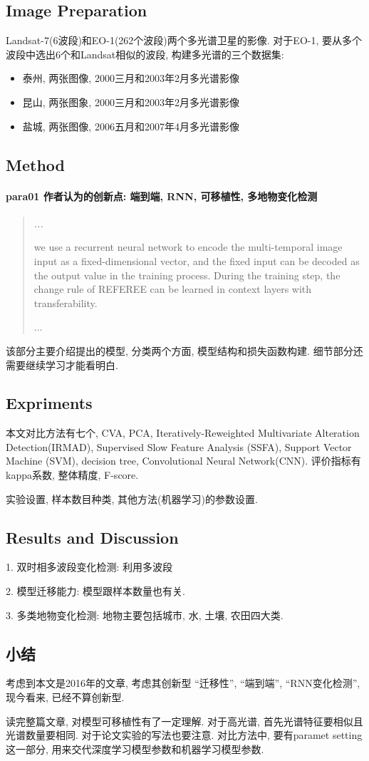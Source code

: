\subsection{Image Preparation}
Landsat-7(6波段)和EO-1(262个波段)两个多光谱卫星的影像. 对于EO-1, 要从多个波段中选出6个和Landsat相似的波段, 构建多光谱的三个数据集:
\begin{itemize}
    \item 泰州, 两张图像, 2000三月和2003年2月多光谱影像
    \item 昆山, 两张图象, 2000三月和2003年2月多光谱影像
    \item 盐城, 两张图像, 2006五月和2007年4月多光谱影像
\end{itemize}
    
\subsection{Method}
\paragraph*{para01
    \textcolor[RGB]{17, 205, 29}{作者认为的创新点: 端到端, RNN, 可移植性, 多地物变化检测}}
\begin{quotation}
    \itshape
    ...

    we use a recurrent neural network to encode the multi-temporal image input as a fixed-dimensional vector, and the fixed input can be decoded as the output value in the training process. During the training step, the change rule of REFEREE can be learned in context layers with transferability.

    ...
\end{quotation}

该部分主要介绍提出的模型, 分类两个方面, 模型结构和损失函数构建. 细节部分还需要继续学习才能看明白.

\subsection{Expriments}
本文对比方法有七个, CVA, PCA, Iteratively-Reweighted Multivariate Alteration Detection(IRMAD), Supervised Slow Feature Analysis (SSFA), Support Vector Machine (SVM), decision tree,  Convolutional Neural Network(CNN). 评价指标有kappa系数, 整体精度, F-score.

实验设置, 样本数目种类, 其他方法(机器学习)的参数设置.

\subsection{Results and Discussion}
1. 双时相多波段变化检测: 利用多波段

2. 模型迁移能力: 模型跟样本数量也有关.

3. 多类地物变化检测: 地物主要包括城市, 水, 土壤, 农田四大类.

\subsection{小结}
考虑到本文是2016年的文章, 考虑其创新型 ``迁移性'', ``端到端'', ``RNN变化检测'', 现今看来, 已经不算创新型. 

读完整篇文章, 对模型可移植性有了一定理解. 对于高光谱, 首先光谱特征要相似且光谱数量要相同. 对于论文实验的写法也要注意. 对比方法中, 要有paramet setting这一部分, 用来交代深度学习模型参数和机器学习模型参数. 